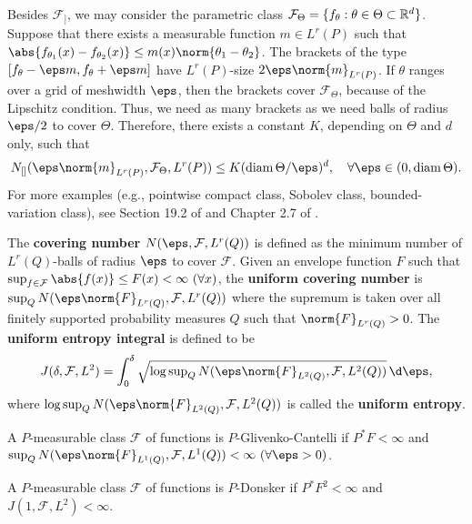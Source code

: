 \documentclass[12pt, a3paper, openany]{book}
\begin{document}
Besides $\mathcal{F}_{]}$, we may consider the parametric class $\mathcal{F}_{\Theta} = \{ f_{\theta} : \theta \in \Theta \subset \mathbb{R}^{d} \}$. Suppose that there exists a measurable function $m \in L^{r}(P)$ such that $\abs{f_{\theta_{1}}(x)-f_{\theta_{2}}(x)} \leq m(x) \norm{\theta_{1}-\theta_{2}}$. The brackets of the type $[f_{\theta} - \eps m, f_{\theta} + \eps m]$ have $L^{r}(P)$-size $2 \eps \norm{m}_{L^{r}(P)}$. If $\theta$ ranges over a grid of meshwidth $\eps$, then the brackets cover $\mathcal{F}_{\Theta}$, because of the
Lipschitz condition. Thus, we need as many brackets as we need balls of radius $\eps/2$ to cover $\Theta$. Therefore, there exists a constant $K$, depending on $\Theta$ and $d$ only, such that 
\[ N_{[]}(\eps\norm{m}_{L^{r}(P)}, \mathcal{F}_{\Theta}, L^{r}(P)) \leq K (\operatorname{diam}\Theta/\eps)^{d} , \quad \forall \eps \in (0, \operatorname{diam}\Theta) . \]
For more examples (e.g., pointwise compact class, Sobolev class, bounded-variation class), see Section 19.2 of \cite{vdVaart1998asymptotic} and Chapter 2.7 of \cite{vdVaart-Wellner-1996-Weak}.

The \textbf{covering number} $N(\eps,\mathcal{F},L^{r}(Q))$ is defined as the minimum number of $L^{r}(Q)$-balls of radius $\eps$ to cover $\mathcal{F}$. Given an envelope function $F$ such that $\sup_{f\in\mathcal{F}} \abs{f(x)} \leq F(x) < \infty \ (\forall x)$, the \textbf{uniform covering number} is $\sup_{Q} N(\eps\norm{F}_{L^{r}(Q)}, \mathcal{F}, L^{r}(Q))$ where the supremum is taken over all finitely supported probability measures $Q$ such that $\norm{F}_{L^{r}(Q)} > 0$.
The \textbf{uniform entropy integral} is defined to be 
\[ J(\delta,\mathcal{F},L^{2}) = \int_{0}^{\delta} \sqrt{\log \sup\nolimits_{Q} N(\eps\norm{F}_{L^{2}(Q)}, \mathcal{F}, L^{2}(Q))} \,\d \eps , \]
where $\log \sup_{Q} N(\eps\norm{F}_{L^{2}(Q)}, \mathcal{F}, L^{2}(Q))$ is called the \textbf{uniform entropy}.

\begin{Theo}
A $P$-measurable class $\mathcal{F}$ of functions is $P$-Glivenko-Cantelli if $P^{*}F < \infty$ and $\sup_{Q} N(\eps\norm{F}_{L^{1}(Q)},\mathcal{F},L^{1}(Q)) < \infty \ (\forall \eps > 0)$.
\end{Theo}

\begin{Theo}
A $P$-measurable class $\mathcal{F}$ of functions is $P$-Donsker if $P^{*}F^{2} < \infty$ and $J(1,\mathcal{F},L^{2}) < \infty$.
\end{Theo}
\end{document}
